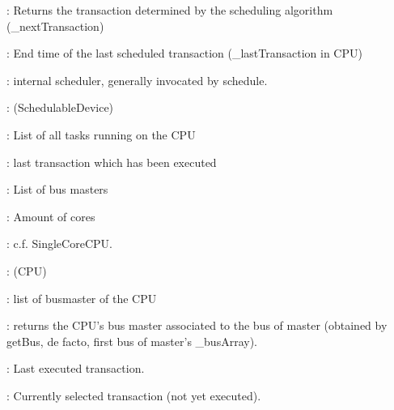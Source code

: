 \documentclass[a4paper,11pt]{article}
\newcommand{\bfont}{\fontseries{b}\selectfont}
\newcommand{\cod}[1]{{\ttfamily #1}}
\newcommand{\class}[2]{\par\vspace{1mm}\hspace{-5mm}\large\colorbox{file}{\textbullet\bfont\cod{#1}:} (\cod{#2})\par}
\newcommand{\method}[1]{\par\vspace{1mm}\hspace{-2mm}\colorbox{method}{\textopenbullet\bfont\cod{#1}:}}
\newcommand{\variable}[1]{\par\vspace{1mm}\hspace{-2mm}\colorbox{variable}{\textopenbullet\bfont\cod{#1}:}}
\begin{document}
\method{getNextTransaction()} Returns the transaction determined by the scheduling algorithm (\cod{\_nextTransaction})


\variable{\_endSchedule} End time of the last scheduled transaction (\cod{\_lastTransaction} in CPU)

\variable{\_scheduler} internal scheduler, generally invocated by \cod{schedule}.

\class{CPU}{SchedulableDevice}

\variable{\_taskList} List of all tasks running on the CPU

\variable{\_lastTransaction} last transaction which has been executed

\variable{\_busMasterList} List of bus masters

\variable{amountOfCore} Amount of cores

\method{virtual truncateAndAddNextTransAt(iTime), truncateNextTrans(iTime)} c.f. \cod{SingleCoreCPU}.

\class{SingleCoreCPU}{CPU}

\variable{\_busMasterList} list of busmaster of the CPU
	
\method{getMasterForBus(master)} returns the CPU's bus master associated to the bus of master (obtained by getBus, de facto, first bus of master's \cod{\_busArray}).

\variable{\_lastTransaction} Last executed transaction.

\variable{\_nextTransaction} Currently selected transaction (not yet executed).
\end{document}
